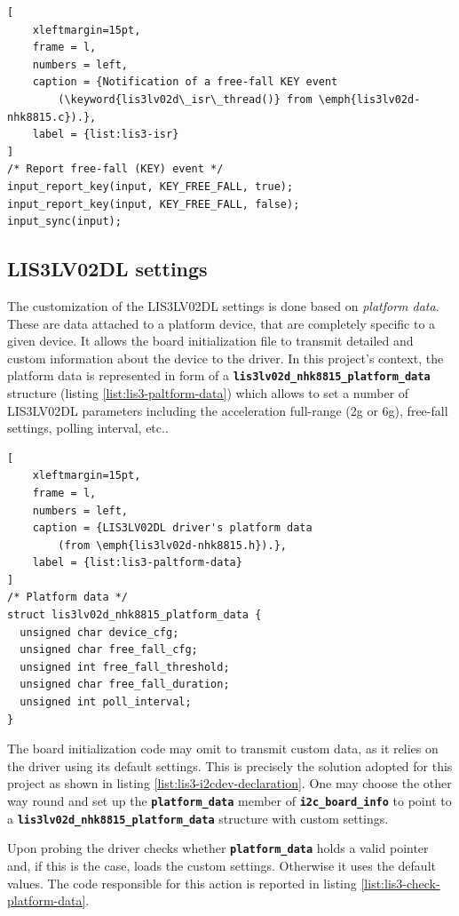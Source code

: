 \documentclass[a4paper,10pt]{article}
\newcommand{\keyword}[1]{\texttt{\textbf{#1}}}
\begin{document}
\begin{multicols}{2}
\begin{lstlisting}[
	xleftmargin=15pt,
	frame = l,
	numbers = left,
	caption = {Notification of a free-fall KEY event
		(\keyword{lis3lv02d\_isr\_thread()} from \emph{lis3lv02d-nhk8815.c}).},
	label = {list:lis3-isr}
]
/* Report free-fall (KEY) event */
input_report_key(input, KEY_FREE_FALL, true);
input_report_key(input, KEY_FREE_FALL, false);
input_sync(input);
\end{lstlisting}


\subsection{LIS3LV02DL settings}
\label{sec:lis3_settings}

The customization of the LIS3LV02DL settings is done based on \emph{platform data}.
These are data attached to a platform device, that are completely specific to
a given device. It allows the board initialization file to transmit detailed and
custom information about the device to the driver.
In this project's context, the platform data is represented in form of a
\keyword{lis3lv02d\_nhk8815\_platform\_data} structure
(listing \ref{list:lis3-paltform-data}) which allows to set a number of LIS3LV02DL parameters including the acceleration full-range (2g or 6g), free-fall settings,
polling interval, etc..

\begin{lstlisting}[
	xleftmargin=15pt,
	frame = l,
	numbers = left,
	caption = {LIS3LV02DL driver's platform data
		(from \emph{lis3lv02d-nhk8815.h}).},
	label = {list:lis3-paltform-data}
]
/* Platform data */
struct lis3lv02d_nhk8815_platform_data {
  unsigned char device_cfg;
  unsigned char free_fall_cfg;
  unsigned int free_fall_threshold;
  unsigned char free_fall_duration;
  unsigned int poll_interval;
}
\end{lstlisting}

The board initialization code may omit to transmit custom data, as it relies on
the driver using its default settings. This is precisely the solution adopted for
this project as shown in listing \ref{list:lis3-i2cdev-declaration}.
One may choose the other way round and set up the \keyword{platform\_data}
member of \keyword{i2c\_board\_info} to point to a 
\keyword{lis3lv02d\_nhk8815\_platform\_data} structure with custom settings.

Upon probing the driver checks whether \keyword{platform\_data} holds a valid
pointer and, if this is the case, loads the custom settings. Otherwise it uses
the default values. The code responsible for this action is reported in listing
\ref{list:lis3-check-platform-data}.


\end{multicols}
\end{document}
